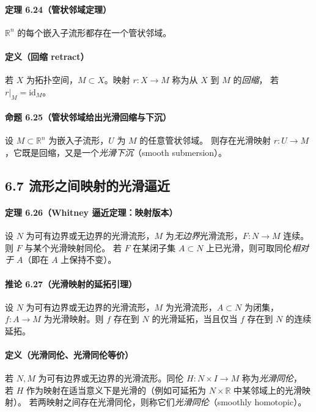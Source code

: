 \documentclass[11pt,a4paper]{article}
\begin{document}
\paragraph{定理 6.24（管状邻域定理）}
$\mathbb R^n$ 的每个嵌入子流形都存在一个管状邻域。

\paragraph{定义（回缩 retract）}
若 $X$ 为拓扑空间，$M\subset X$。映射 $r:X\to M$ 称为从 $X$ 到 $M$ 的\emph{回缩}，
若 $r|_M=\mathrm{id}_M$。

\paragraph{命题 6.25（管状邻域给出光滑回缩与下沉）}
设 $M\subset\mathbb R^n$ 为嵌入子流形，$U$ 为 $M$ 的任意管状邻域。
则存在光滑映射 $r:U\to M$，它既是回缩，又是一个\emph{光滑下沉}（smooth submersion）。

\subsection*{6.7 流形之间映射的光滑逼近}

\paragraph{定理 6.26（Whitney 逼近定理：映射版本）}
设 $N$ 为可有边界或无边界的光滑流形，$M$ 为\emph{无边界}光滑流形，$F:N\to M$ 连续。
则 $F$ 与某个光滑映射同伦。
若 $F$ 在某闭子集 $A\subset N$ 上已光滑，则可取同伦\emph{相对于 $A$}（即在 $A$ 上保持不变）。

\paragraph{推论 6.27（光滑映射的延拓引理）}
设 $N$ 为可有边界或无边界的光滑流形，$M$ 为光滑流形，$A\subset N$ 为闭集，
$f:A\to M$ 为光滑映射。则 $f$ 存在到 $N$ 的光滑延拓，当且仅当 $f$ 存在到 $N$ 的连续延拓。

\paragraph{定义（光滑同伦、光滑同伦等价）}
若 $N,M$ 为可有边界或无边界的光滑流形。同伦 $H:N\times I\to M$ 称为\emph{光滑同伦}，
若 $H$ 作为映射在适当意义下是光滑的（例如可延拓为 $N\times\mathbb R$ 中某邻域上的光滑映射）。
若两映射之间存在光滑同伦，则称它们\emph{光滑同伦}（smoothly homotopic）。
\end{document}
